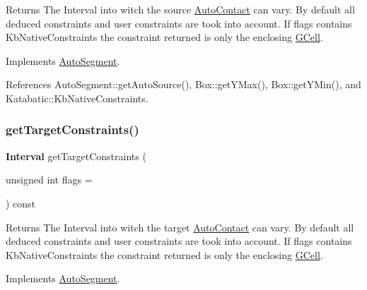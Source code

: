 \begin{DoxyReturn}{Returns}
The Interval into witch the source \hyperlink{classKatabatic_1_1AutoContact}{Auto\+Contact} can vary. By default all deduced constraints and user constraints are took into account. If {\ttfamily flags} contains {\ttfamily Kb\+Native\+Constraints} the constraint returned is only the enclosing \hyperlink{classKatabatic_1_1GCell}{G\+Cell}. 
\end{DoxyReturn}


Implements \hyperlink{classKatabatic_1_1AutoSegment_ab7685e309e1d910db3e8237f8a898c35}{Auto\+Segment}.



References Auto\+Segment\+::get\+Auto\+Source(), Box\+::get\+Y\+Max(), Box\+::get\+Y\+Min(), and Katabatic\+::\+Kb\+Native\+Constraints.

\mbox{\label{classKatabatic_1_1AutoHorizontal_ad2b5aeb2604548378c8d78c60862091f}} 
\subsubsection{\texorpdfstring{get\+Target\+Constraints()}{getTargetConstraints()}}
{\footnotesize\ttfamily \textbf{ Interval} get\+Target\+Constraints (\begin{DoxyParamCaption}\item[{unsigned int}]{flags = {} }\end{DoxyParamCaption}) const\hspace{0.3cm}{\ttfamily [virtual]}}

\begin{DoxyReturn}{Returns}
The Interval into witch the target \hyperlink{classKatabatic_1_1AutoContact}{Auto\+Contact} can vary. By default all deduced constraints and user constraints are took into account. If {\ttfamily flags} contains {\ttfamily Kb\+Native\+Constraints} the constraint returned is only the enclosing \hyperlink{classKatabatic_1_1GCell}{G\+Cell}. 
\end{DoxyReturn}


Implements \hyperlink{classKatabatic_1_1AutoSegment_a9c1b8b3cd57fb7b0bf60c7a6148237c2}{Auto\+Segment}.



